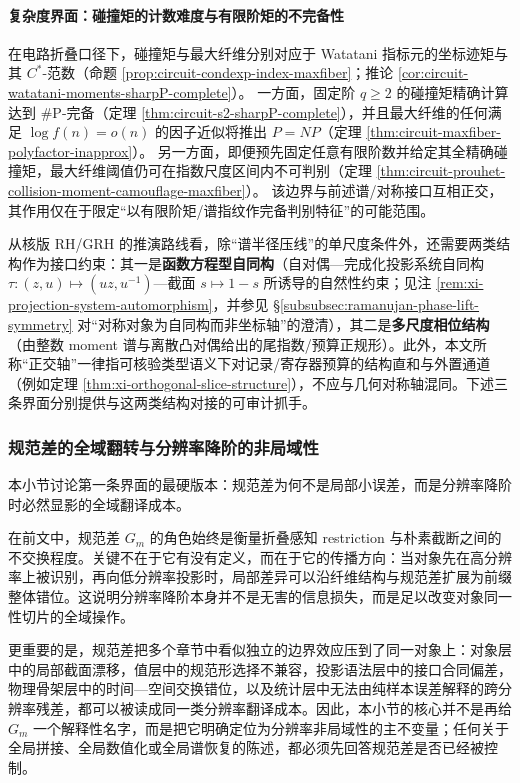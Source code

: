 \paragraph{复杂度界面：碰撞矩的计数难度与有限阶矩的不完备性}
在电路折叠口径下，碰撞矩与最大纤维分别对应于 Watatani 指标元的坐标迹矩与其 \(C^\ast\)-范数（命题 \ref{prop:circuit-condexp-index-maxfiber}；推论 \ref{cor:circuit-watatani-moments-sharpP-complete}）。
一方面，固定阶 \(q\ge 2\) 的碰撞矩精确计算达到 \(\#\mathrm{P}\)-完备（定理 \ref{thm:circuit-s2-sharpP-complete}），并且最大纤维的任何满足 \(\log f(n)=o(n)\) 的因子近似将推出 \(P=NP\)（定理 \ref{thm:circuit-maxfiber-polyfactor-inapprox}）。
另一方面，即便预先固定任意有限阶数并给定其全精确碰撞矩，最大纤维阈值仍可在指数尺度区间内不可判别（定理 \ref{thm:circuit-prouhet-collision-moment-camouflage-maxfiber}）。
该边界与前述谱/对称接口互相正交，其作用仅在于限定“以有限阶矩/谱指纹作完备判别特征”的可能范围。
\par
从核版 RH/GRH 的推演路线看，除“谱半径压线”的单尺度条件外，还需要两类结构作为接口约束：其一是\textbf{函数方程型自同构}（自对偶—完成化投影系统自同构 \(\tau:(z,u)\mapsto(uz,u^{-1})\)—截面 \(s\mapsto 1-s\) 所诱导的自然性约束；见注 \ref{rem:xi-projection-system-automorphism}，并参见 \S\ref{subsubsec:ramanujan-phase-lift-symmetry} 对“对称对象为自同构而非坐标轴”的澄清），其二是\textbf{多尺度相位结构}（由整数 moment 谱与离散凸对偶给出的尾指数/预算正规形）。此外，本文所称“正交轴”一律指可核验类型语义下对记录/寄存器预算的结构直和与外置通道（例如定理 \ref{thm:xi-orthogonal-slice-structure}），不应与几何对称轴混同。下述三条界面分别提供与这两类结构对接的可审计抓手。

\subsubsection{规范差的全域翻转与分辨率降阶的非局域性}\label{subsubsec:insight-gauge-anomaly}
本小节讨论第一条界面的最硬版本：规范差为何不是局部小误差，而是分辨率降阶时必然显影的全域翻译成本。

在前文中，规范差 \(G_m\) 的角色始终是衡量折叠感知 restriction 与朴素截断之间的不交换程度。关键不在于它有没有定义，而在于它的传播方向：当对象先在高分辨率上被识别，再向低分辨率投影时，局部差异可以沿纤维结构与规范差扩展为前缀整体错位。这说明分辨率降阶本身并不是无害的信息损失，而是足以改变对象同一性切片的全域操作。

更重要的是，规范差把多个章节中看似独立的边界效应压到了同一对象上：对象层中的局部截面漂移，值层中的规范形选择不兼容，投影语法层中的接口合同偏差，物理骨架层中的时间—空间交换错位，以及统计层中无法由纯样本误差解释的跨分辨率残差，都可以被读成同一类分辨率翻译成本。因此，本小节的核心并不是再给 \(G_m\) 一个解释性名字，而是把它明确定位为分辨率非局域性的主不变量；任何关于全局拼接、全局数值化或全局谱恢复的陈述，都必须先回答规范差是否已经被控制。

